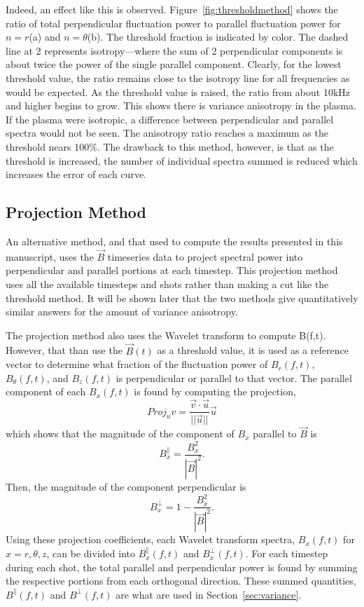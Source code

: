 \documentclass[aip,prl,amsmath,amssymb,reprint,superscriptaddress]{revtex4-1} %
\begin{document}
Indeed, an effect like this is observed. Figure~\ref{fig:thresholdmethod} shows the ratio of total perpendicular fluctuation power to parallel fluctuation power for $n = r$(a) and $n = \theta$(b). The threshold fraction is indicated by color. The dashed line at 2 represents isotropy---where the sum of 2 perpendicular components is about twice the power of the single parallel component. Clearly, for the lowest threshold value, the ratio remains close to the isotropy line for all frequencies as would be expected. As the threshold value is raised, the ratio from about 10kHz and higher begins to grow. This shows there is variance anisotropy in the plasma. If the plasma were isotropic, a difference between perpendicular and parallel spectra would not be seen. The anisotropy ratio reaches a maximum as the threshold nears 100\%. The drawback to this method, however, is that as the threshold is increased, the number of individual spectra summed is reduced which increases the error of each curve.

\subsection{Projection Method}

An alternative method, and that used to compute the results presented in this manuscript, uses the $\vec{B}$ timeseries data to project spectral power into perpendicular and parallel portions at each timestep. This projection method uses all the available timesteps and shots rather than making a cut like the threshold method. It will be shown later that the two methods give quantitatively similar answers for the amount of variance anisotropy.

The projection method also uses the Wavelet transform to compute B(f,t). However, that than use the $\vec{B}(t)$ as a threshold value, it is used as a reference vector to determine what fraction of the fluctuation power of $B_{r}(f,t)$, $B_{\theta}(f,t)$, and $B_{z}(f,t)$ is perpendicular or parallel to that vector. The parallel component of each $B_{x}(f,t)$ is found by computing the projection,
\begin{equation}
Proj_{u}v = \frac{\vec{v} \cdot \vec{u}}{||\vec{u}||}\vec{u}
\label{eq:projection}
\end{equation}
which shows that the magnitude of the component of $B_{x}$ parallel to $\vec{B}$ is
\begin{equation}
B_{x}^{\parallel} = \frac{B^{2}_{x}}{|\vec{B}|^{2}}.
\label{eq:para_mag}
\end{equation}
Then, the magnitude of the component perpendicular is
\begin{equation}
B_{x}^{\perp} = 1 - \frac{B^{2}_{x}}{|\vec{B}|^{2}}.
\label{eq:perp_mag}
\end{equation}
Using these projection coefficients, each Wavelet transform spectra, $B_{x}(f,t)$ for $x = r,\theta,z$, can be divided into $B_{x}^{\parallel}(f,t)$ and $B_{x}^{\perp}(f,t)$. For each timestep during each shot, the total parallel and perpendicular power is found by summing the respective portions from each orthogonal direction. These summed quantities, $B^{\parallel}(f,t)$ and $B^{\perp}(f,t)$ are what are used in Section~\ref{sec:variance}.
\end{document}
